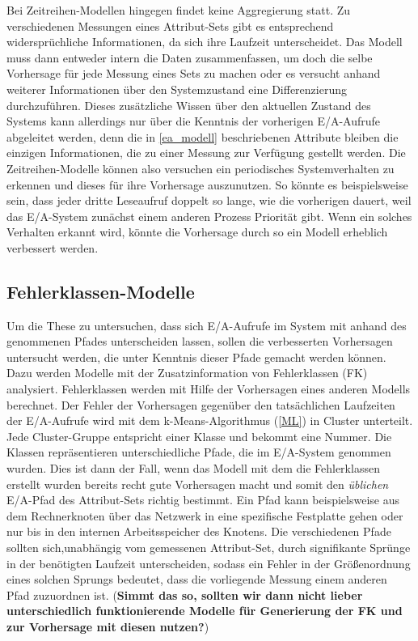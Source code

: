 \documentclass[
	12pt,
	a4paper,
	BCOR10mm,
	DIV14,
	listof=totoc,
	bibliography=totoc,
	headsepline
]{scrreprt}
\begin{document}
Bei Zeitreihen-Modellen hingegen findet keine Aggregierung statt. Zu verschiedenen Messungen eines Attribut-Sets gibt es entsprechend \glqq widersprüchliche\grqq{} Informationen, da sich ihre Laufzeit unterscheidet. Das Modell muss dann entweder intern die Daten zusammenfassen, um doch die selbe Vorhersage für jede Messung eines Sets zu machen oder es versucht anhand weiterer Informationen über den Systemzustand eine Differenzierung durchzuführen. Dieses zusätzliche Wissen über den aktuellen Zustand des Systems kann allerdings nur über die Kenntnis der vorherigen E/A-Aufrufe abgeleitet werden, denn die in \ref{ea_modell} beschriebenen Attribute bleiben die einzigen Informationen, die zu einer Messung zur Verfügung gestellt werden.
Die Zeitreihen-Modelle können also versuchen ein periodisches Systemverhalten zu erkennen und dieses für ihre Vorhersage auszunutzen. So könnte es beispielsweise sein, dass jeder dritte Leseaufruf doppelt so lange, wie die vorherigen dauert, weil das E/A-System zunächst einem anderen Prozess Priorität gibt. Wenn ein solches Verhalten erkannt wird, könnte die Vorhersage durch so ein Modell erheblich verbessert werden.

\subsection{Fehlerklassen-Modelle}
\label{fk-modelle}
Um die These zu untersuchen, dass sich E/A-Aufrufe im System mit anhand des genommenen Pfades unterscheiden lassen, sollen die verbesserten Vorhersagen untersucht werden, die unter Kenntnis dieser Pfade gemacht werden können. Dazu werden Modelle mit der Zusatzinformation von Fehlerklassen (FK) analysiert.
Fehlerklassen werden mit Hilfe der Vorhersagen eines anderen Modells berechnet. Der Fehler der Vorhersagen gegenüber den tatsächlichen Laufzeiten der E/A-Aufrufe wird mit dem k-Means-Algorithmus (\ref{ML}) in Cluster unterteilt. Jede Cluster-Gruppe entspricht einer Klasse und bekommt eine Nummer. 
Die Klassen repräsentieren unterschiedliche Pfade, die im E/A-System genommen wurden. Dies ist dann der Fall, wenn das Modell mit dem die Fehlerklassen erstellt wurden bereits recht gute Vorhersagen macht und somit den \textit{üblichen} E/A-Pfad des Attribut-Sets richtig bestimmt.
Ein Pfad kann beispielsweise aus dem Rechnerknoten über das Netzwerk in eine spezifische Festplatte gehen oder nur bis in den internen Arbeitsspeicher des Knotens.
Die verschiedenen Pfade sollten sich,unabhängig vom gemessenen Attribut-Set, durch signifikante Sprünge in der benötigten Laufzeit unterscheiden, sodass ein Fehler in der Größenordnung eines solchen Sprungs bedeutet, dass die vorliegende Messung einem anderen Pfad zuzuordnen ist. (\textbf{Simmt das so, sollten wir dann nicht lieber unterschiedlich funktionierende Modelle für Generierung der FK und zur Vorhersage mit diesen nutzen?})
\end{document}
